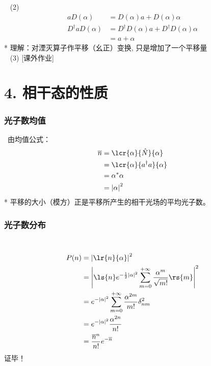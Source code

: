 \begin{frame}
 \frametitle{}
 \证~ (2) 
   \[ 
    \begin{aligned}
        a D (\alpha) &=  D (\alpha) a  +  D (\alpha)\alpha  \\
        D^\dagger  a D (\alpha) &= D^\dagger D (\alpha) a  + D^\dagger D (\alpha)\alpha  \\
        &= a + \alpha
  \end{aligned}  
  \] 
  * 理解：对湮灭算子作平移（幺正）变换, 只是增加了一个平移量 \\ {\vspace*{1.3em}}
  \证 ~ (3) [课外作业]
\end{frame}

\section{4. 相干态的性质}

\begin{frame}
    \frametitle{光子数均值}
        \证 ~由均值公式：    
    \[ \begin{aligned}
     \overline{n} &=\lcr{\alpha}{\hat{N}}{\alpha} \\ 
     &= \lcr{\alpha}{a^{\dagger} a  }{\alpha}  \\ 
     &= \alpha^* \alpha \\ 
     &= \left| \alpha\right|^2  \\ 
    \end{aligned}\]
    * 平移的大小（模方）正是平移所产生的相干光场的平均光子数。
\end{frame}

\begin{frame}
    \frametitle{光子数分布}
        \证 ~    
    \[ \begin{aligned}
     P (n) &=\left|\lr{n}{\alpha}\right|^2 \\ 
    &= \left|\ls{n} e^{-\frac{1}{2}\left|\alpha\right|^2}  \sum_{m=0} ^{+\infty}  \frac{\alpha^m}{\sqrt{m!}} \rs{m} \right|^2\\
    &=  e^{-\left|\alpha\right|^2}  \sum_{m=0} ^{+\infty}  \frac{\alpha^{2m}}{m!} \delta_{nm} ^2  \\ 
    &=  e^{-\left|\alpha\right|^2}  \frac{\alpha^{2n}}{n!} \\
    &=  \frac{ \overline{n} ^{n} }{n!}e^{-\overline{n}} 
    \end{aligned}\]
    证毕！
\end{frame} 

